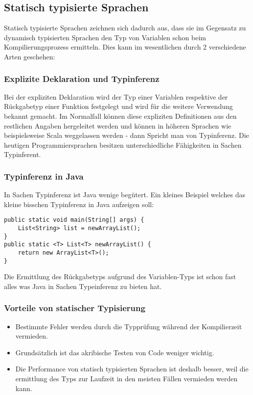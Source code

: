\subsection{Statisch typisierte Sprachen}
Statisch typisierte Sprachen zeichnen sich dadurch aus, dass sie im Gegensatz zu dynamisch typisierten Sprachen den Typ von Variablen schon beim Kompilierungsprozess ermitteln. Dies kann im wesentlichen durch 2 verschiedene Arten geschehen:

\subsubsection{Explizite Deklaration und Typinferenz}
Bei der expliziten Deklaration wird der Typ einer Variablen respektive der R\"uckgabetyp einer Funktion festgelegt und wird f\"ur die weitere Verwendung bekannt gemacht. Im Normalfall k\"onnen diese expliziten Definitionen aus den restlichen Angaben hergeleitet werden und k\"onnen in h\"oheren Sprachen wie beispielsweise Scala weggelassen werden - dann Spricht man von Typinferenz. Die heutigen Programmiersprachen besitzen unterschiedliche F\"ahigkeiten in Sachen Typinferent. 

\subsubsection{Typinferenz in Java}
In Sachen Typinferenz ist Java wenige beg\"utert. Ein kleines Beispiel welches das kleine bisschen Typinferenz in Java aufzeigen soll:

\begin{lstlisting}[caption=Typeinferenz in Java]
public static void main(String[] args) {
	List<String> list = newArrayList();
}
public static <T> List<T> newArrayList() {
	return new ArrayList<T>();
}
\end{lstlisting}
Die Ermittlung des R\"uckgabetyps aufgrund des Variablen-Typs ist schon fast alles was Java in Sachen Typeinferenz zu bieten hat.

\subsubsection{Vorteile von statischer Typisierung}
\begin{itemize}
\item Bestimmte Fehler werden durch die Typpr\"ufung w\"ahrend der Kompilierzeit vermieden.
\item Grunds\"atzlich ist das akribische Testen von Code weniger wichtig. 
\item Die Performance von statisch typisierten Sprachen ist deshalb besser, weil die ermittlung des Typs zur Laufzeit in den meisten F\"allen vermieden werden kann.
\end{itemize}

